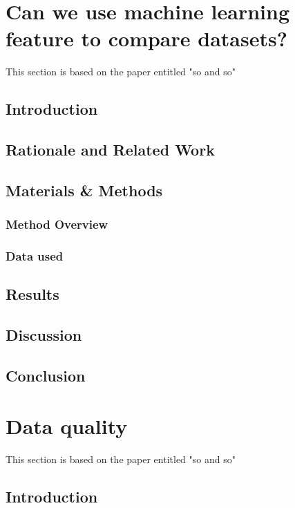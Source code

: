 



\section{Can we use machine learning feature to compare datasets?}\label{subsec:similarity}
This section is based on the paper entitled "so and so"

\subsection{Introduction}

\subsection{Rationale and Related Work}

\subsection{Materials \& Methods}
\subsubsection{Method Overview}

\subsubsection{Data used}

\subsection{Results}

\subsection{Discussion}

\subsection{Conclusion}



\section{Data quality}\label{subsec:dq}
This section is based on the paper entitled "so and so"
%
\subsection{Introduction}

